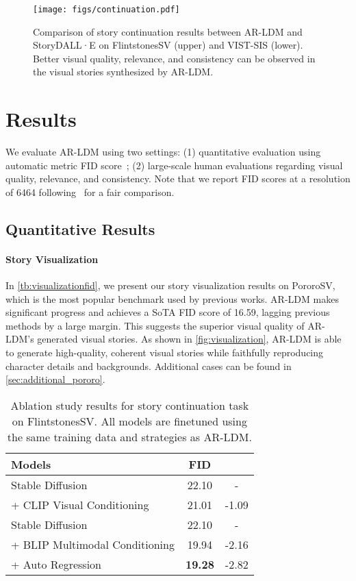 \documentclass[10pt,twocolumn,letterpaper]{article}
\begin{document}
\begin{figure*}[!th]
    \centering
    \texttt{[image: figs/continuation.pdf]}
    \caption{Comparison of story continuation results between AR-LDM and StoryDALL·E on FlintstonesSV (upper) and VIST-SIS (lower). Better visual quality, relevance, and consistency can be observed in the visual stories synthesized by AR-LDM.}
    \label{fig:continuation}
\end{figure*}

\section{Results}
We evaluate AR-LDM using two settings: (1) quantitative evaluation using automatic metric FID score~\cite{fid}; (2) large-scale human evaluations regarding visual quality, relevance, and consistency. Note that we report FID scores at a resolution of 6464 following~\cite{storydalle} for a fair comparison.

\subsection{Quantitative Results}
\paragraph{Story Visualization}
In \cref{tb:visualizationfid}, we present our story visualization results on PororoSV, which is the most popular benchmark used by previous works. AR-LDM makes significant progress and achieves a SoTA FID score of 16.59, lagging previous methods by a large margin. This suggests the superior visual quality of AR-LDM's generated visual stories. As shown in \cref{fig:visualization}, AR-LDM is able to generate high-quality, coherent visual stories while faithfully reproducing character details and backgrounds. Additional cases can be found in \cref{sec:additional_pororo}.

\begin{table}[!t]
\small
\centering
\setlength\tabcolsep{11pt}
\begin{tabularx}{\linewidth}{lcc}
    \toprule
    Models & FID & \\
    \midrule
    Stable Diffusion~\cite{ldm} & 22.10 & - \\
    \quad + CLIP Visual Conditioning & 21.01 & -1.09\\
    \midrule
    Stable Diffusion~\cite{ldm} & 22.10 & - \\
    \quad + BLIP Multimodal Conditioning & 19.94 & -2.16 \\
    \quad \quad + Auto Regression & \textbf{19.28} & -2.82 \\
    \bottomrule
    \end{tabularx}
\caption{Ablation study results for story continuation task on FlintstonesSV. All models are finetuned using the same training data and strategies as AR-LDM.}
\label{tb:ablation}
\end{table}
\end{document}
